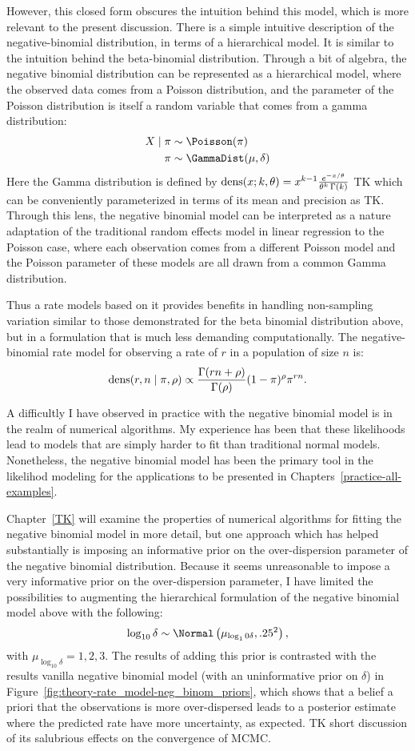 However, this closed form obscures the intuition behind this model,
which is more relevant to the present discussion.
There is a simple intuitive description of the negative-binomial
distribution, in terms of a hierarchical model.  It is similar to the
intuition behind the beta-binomial distribution. Through a bit of
algebra, the negative binomial distribution can be represented as a
hierarchical model, where the observed data comes from a Poisson
distribution, and the parameter of the Poisson distribution is itself
a random variable that comes from a gamma distribution:
\begin{align*}
X\given \pi &\sim \Poisson(\pi)\\
\pi &\sim \GammaDist(\mu, \delta)
\end{align*}
Here the Gamma distribution is defined by $\operatorname{dens}(x; k,\theta) =
x^{k-1} \frac{e^{-x/\theta}}{\theta^k \, \Gamma(k)}$ TK which can be
conveniently parameterized in terms of its mean and precision as TK.
Through this lens, the negative binomial model can be interpreted as a
nature adaptation of the traditional random effects model in linear
regression to the Poisson case, where each observation comes from a
different Poisson model and the Poisson parameter of these models are
all drawn from a common Gamma distribution.

Thus a rate models based on it provides benefits in handling
non-sampling variation similar to those demonstrated for the beta
binomial distribution above, but in a formulation that is much less
demanding computationally.  The negative-binomial rate model for
observing a rate of $r$ in a population of size $n$ is:
\[
\operatorname{dens}(r,n\;|\; \pi, \rho) \propto \frac{\Gamma(rn+\rho)}{\Gamma(\rho)} (1-\pi)^\rho \pi^{rn}.
\]

A difficultly I have observed in practice with the negative binomial
model is in the realm of numerical algorithms.  My experience has been that these
likelihoods lead to models that are simply harder to fit than
traditional normal models.  Nonetheless, the negative binomial model
has been the primary tool in the likelihod modeling for the
applications to be presented in Chapters~\ref{practice-all-examples}.

Chapter~\ref{TK} will examine the properties of numerical algorithms
for fitting the negative binomial model in more detail, but one
approach which has helped substantially is imposing an informative
prior on the over-dispersion parameter of the negative binomial
distribution.  Because it seems unreasonable to impose a very informative prior on the over-dispersion parameter, I have limited the possibilities to augmenting the hierarchical formulation of the negative binomial model above with the following:
\[
\log_{10} \delta \sim \Normal\left(\mu_{\log_10\delta}, .25^2\right),
\]
with $\mu_{\log_10\delta} = 1, 2, 3$.  The results of adding this
prior is contrasted with the results vanilla negative binomial model
(with an uninformative prior on $\delta$) in
Figure~\ref{fig:theory-rate_model-neg_binom_priors}, which shows that
a belief a priori that the observations is more over-dispersed leads
to a posterior estimate where the predicted rate have more
uncertainty, as expected.  TK short discussion of its salubrious
effects on the convergence of MCMC.


